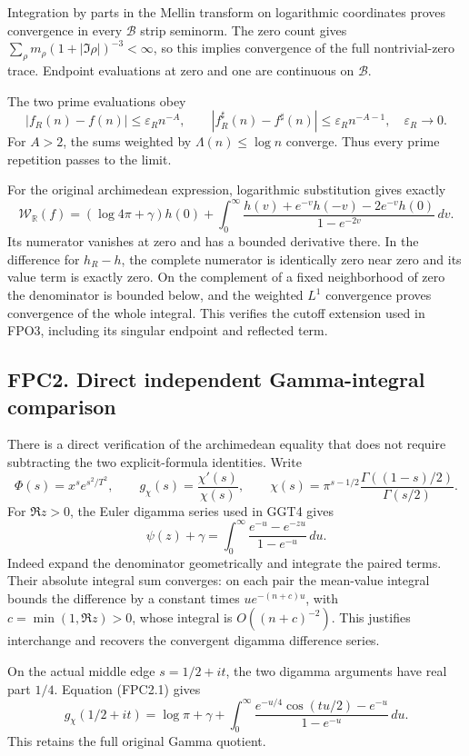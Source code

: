 Integration by parts in the Mellin transform on logarithmic coordinates
proves convergence in every \(\mathcal B\) strip seminorm. The zero
count gives \(\sum_\rho m_\rho(1+|\Im\rho|)^{-3}<\infty\), so this
implies convergence of the full nontrivial-zero trace. Endpoint
evaluations at zero and one are continuous on \(\mathcal B\).

The two prime evaluations obey \[
|f_R(n)-f(n)|\le\varepsilon_R n^{-A},\qquad
|f_R^\sharp(n)-f^\sharp(n)|\le\varepsilon_R n^{-A-1},
\quad \varepsilon_R\to0.
\] For \(A>2\), the sums weighted by \(\Lambda(n)\le\log n\) converge.
Thus every prime repetition passes to the limit.

For the original archimedean expression, logarithmic substitution gives
exactly \[
\mathcal W_{\mathbb R}(f)
=(\log4\pi+\gamma)h(0)
+\int_0^\infty
\frac{h(v)+e^{-v}h(-v)-2e^{-v}h(0)}
{1-e^{-2v}}\,dv.
\tag{FPC1.1}
\] Its numerator vanishes at zero and has a bounded derivative there. In
the difference for \(h_R-h\), the complete numerator is identically zero
near zero and its value term is exactly zero. On the complement of a
fixed neighborhood of zero the denominator is bounded below, and the
weighted \(L^1\) convergence proves convergence of the whole integral.
This verifies the cutoff extension used in FPO3, including its singular
endpoint and reflected term.

\subsection{FPC2. Direct independent Gamma-integral
comparison}\label{fpc2.-direct-independent-gamma-integral-comparison}

There is a direct verification of the archimedean equality that does not
require subtracting the two explicit-formula identities. Write \[
\Phi(s)=x^se^{s^2/T^2},\qquad
g_\chi(s)=\frac{\chi'(s)}{\chi(s)},\qquad
\chi(s)=\pi^{s-1/2}\frac{\Gamma((1-s)/2)}{\Gamma(s/2)}.
\] For \(\Re z>0\), the Euler digamma series used in GGT4 gives \[
\psi(z)+\gamma
=\int_0^\infty\frac{e^{-u}-e^{-zu}}{1-e^{-u}}\,du.
\tag{FPC2.1}
\] Indeed expand the denominator geometrically and integrate the paired
terms. Their absolute integral sum converges: on each pair the
mean-value integral bounds the difference by a constant times
\(u e^{-(n+c)u}\), with \(c=\min(1,\Re z)>0\), whose integral is
\(O((n+c)^{-2})\). This justifies interchange and recovers the
convergent digamma difference series.

On the actual middle edge \(s=1/2+it\), the two digamma arguments have
real part \(1/4\). Equation (FPC2.1) gives \[
g_\chi(1/2+it)=\log\pi+\gamma
+\int_0^\infty
\frac{e^{-u/4}\cos(tu/2)-e^{-u}}{1-e^{-u}}\,du.
\tag{FPC2.2}
\] This retains the full original Gamma quotient.

